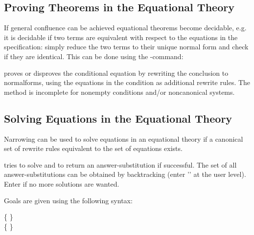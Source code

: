\subsection{Proving Theorems in the Equational Theory}
\label{ProveCommand}

If general confluence can be achieved equational theorems become
decidable, e.g. it is decidable if two terms are equivalent with respect to the
equations in the specification: simply reduce the two terms to their unique normal
form and check if they are identical. This can be done using the
-command:\bigskip

\begin{command}
proves or disproves the conditional equation  by 
rewriting the conclusion to normalforms, using the equations in the 
condition as additional rewrite rules. The method is incomplete for
nonempty conditions and/or noncanonical systems.
\end{command}

%
%


\subsection{Solving Equations in the Equational Theory}
\label{NarrowCommand}

Narrowing can be used to solve equations in an equational theory if a
canonical set of rewrite rules equivalent to the set of equations  exists.\bigskip

\begin{command}
tries to solve  and to return an answer-substitution 
if successful.
The set of all answer-substitutions can be obtained by backtracking
(enter '\kw{;}' at the user level). Enter  if
no more solutions are wanted.

\noindent
Goals are given using the following syntax:

\begin{syntax}
 \IS {}  
          \OR {} \{   \} \END
\\
 \IS {} \{   \} \kw{=>} \END
{}  \IS {} \kw{=}  \END
\end{syntax}
\end{command}
